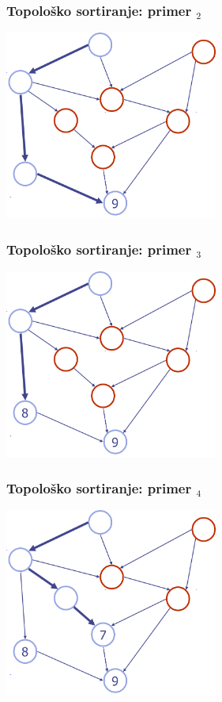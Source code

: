 \documentclass[compress]{beamer}
\begin{document}
\begin{frame}[fragile]
  \frametitle{Topološko sortiranje: primer $_2$}
  \begin{center}
    \includegraphics[width=7cm]{asp-14-pic49.png}
  \end{center}
\end{frame}

\begin{frame}[fragile]
  \frametitle{Topološko sortiranje: primer $_3$}
  \begin{center}
    \includegraphics[width=7cm]{asp-14-pic50.png}
  \end{center}
\end{frame}

\begin{frame}[fragile]
  \frametitle{Topološko sortiranje: primer $_4$}
  \begin{center}
    \includegraphics[width=7cm]{asp-14-pic51.png}
  \end{center}
\end{frame}
\end{document}
